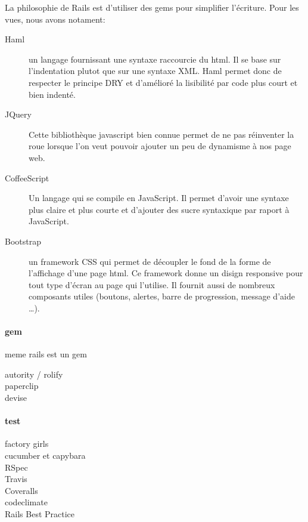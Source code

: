 La philosophie de Rails est d'utiliser des gems pour simplifier l'écriture. Pour les vues, nous avons notament:
\begin{description}
  \item[Haml] un langage fournissant une syntaxe raccourcie du html. Il se base sur l'indentation plutot que sur une syntaxe XML. Haml permet donc de respecter le principe DRY et d'amélioré la lisibilité par code plus court et bien indenté.
  \item[JQuery] Cette bibliothèque javascript bien connue permet de ne pas réinventer la roue lorsque l'on veut pouvoir ajouter un peu de dynamisme à nos page web.
  \item[CoffeeScript] Un langage qui se compile en JavaScript. Il permet d'avoir une syntaxe plus claire et plus courte et d'ajouter des sucre syntaxique par raport à JavaScript.
  \item[Bootstrap] un framework CSS qui permet de découpler le fond de la forme de l'affichage d'une page html. Ce framework donne un disign responsive pour tout type d'écran au page qui l'utilise. Il fournit aussi de nombreux composants utiles (boutons, alertes, barre de progression, message d'aide \ldots).
\end{description}

\paragraph{gem}
meme rails est un gem

\begin{description}
  \item[autority / rolify]
  \item[paperclip]
  \item[devise]
\end{description}

\paragraph{test}
\begin{description}
  \item[factory girls]
  \item[cucumber et capybara]
  \item[RSpec]
  \item[Travis]
  \item[Coveralls]
  \item[codeclimate]
  \item[Rails Best Practice] 
\end{description}
